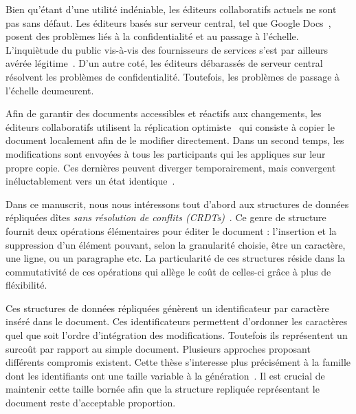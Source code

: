 Bien qu'étant d'une utilité indéniable, les éditeurs collaboratifs actuels ne
sont pas sans défaut. Les éditeurs basés sur serveur central, tel que Google
Docs~\cite{nichols1995high}, posent des problèmes liés à la confidentialité et
au passage à l'échelle. L'inquiètude du public vis-à-vis des fournisseurs de
services s'est par ailleurs avérée légitime~\cite{gellman2013us}. D'un autre
coté, les éditeurs débarassés de serveur central résolvent les problèmes de
confidentialité. Toutefois, les problèmes de passage à l'échelle deumeurent.

Afin de garantir des documents accessibles et réactifs aux changements, les
éditeurs collaboratifs utilisent la réplication
optimiste~\cite{saito2005optimistic} qui consiste à copier le document
localement afin de le modifier directement. Dans un second temps, les
modifications sont envoyées à tous les participants qui les appliques sur leur
propre copie.  Ces dernières peuvent diverger temporairement, mais convergent
inéluctablement vers un état identique~\cite{bailis2013eventual}.

Dans ce manuscrit, nous nous intéressons tout d'abord aux structures de données
répliquées dîtes \emph{sans résolution de conflits
(CRDTs)}~\cite{shapiro2011comprehensive, shapiro2011conflict}. Ce genre de
structure~\cite{ahmed2011evaluating, andre2013supporting, conway2014language,
grishchenko2010deep, oster2006data, preguica2009commutative, roh2011replicated,
weiss2007wooki, weiss2009logoot, wu2010partial, yu2012stringwise} fournit deux
opérations élémentaires pour éditer le document : l'insertion et la suppression
d'un élément pouvant, selon la granularité choisie, être un caractère, une
ligne, ou un paragraphe etc. La particularité de ces structures réside dans la
commutativité de ces opérations qui allège le coût de celles-ci grâce à plus de
fléxibilité.

Ces structures de données répliquées génèrent un identificateur par caractère
inséré dans le document. Ces identificateurs permettent d'ordonner les
caractères quel que soit l'ordre d'intégration des modifications. Toutefois ils
représentent un surcoût par rapport au simple document. Plusieurs approches
proposant différents compromis existent. Cette thèse s'interesse plus
précisément à la famille dont les identifiants ont une taille variable à la
génération~\cite{andre2013supporting, preguica2009commutative, weiss2009logoot}.
Il est crucial de maintenir cette taille bornée afin que la structure repliquée
représentant le document reste d'acceptable proportion.


